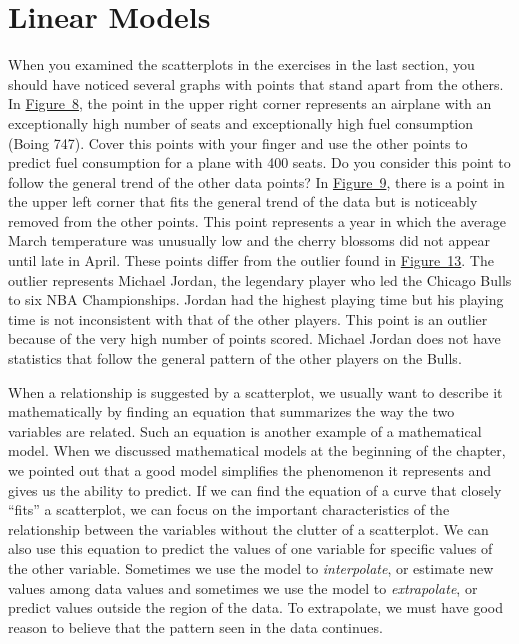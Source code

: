 \documentclass[10pt,]{book}
\theoremstyle{ptxdefinitionnotitle}
\theoremstyle{ptxdefinitiontitle}
\numberwithin{equation}{section}
\begin{document}
\section[{Linear Models}]{Linear Models}\label{chapter01-section05}
\hypertarget{p-92}{}%
When you examined the scatterplots in the exercises in the last section, you should have noticed several graphs with points that stand apart from the others. In \hyperref[exercises-scatterplot-1]{Figure~8}, the point in the upper right corner represents an airplane with an exceptionally high number of seats and exceptionally high fuel consumption (Boing 747). Cover this points with your finger and use the other points to predict fuel consumption for a plane with 400 seats. Do you consider this point to follow the general trend of the other data points? In \hyperref[exercises-scatterplot-2]{Figure~9}, there is a point in the upper left corner that fits the general trend of the data but is noticeably removed from the other points. This point represents a year in which the average March temperature was unusually low and the cherry blossoms did not appear until late in April. These points differ from the outlier found in \hyperref[exercises-scatterplot-6]{Figure~13}. The outlier represents Michael Jordan, the legendary player who led the Chicago Bulls to six NBA Championships. Jordan had the highest playing time but his playing time is not inconsistent with that of the other players. This point is an outlier because of the very high number of points scored. Michael Jordan does not have statistics that follow the general pattern of the other players on the Bulls.%
\par
\hypertarget{p-93}{}%
When a relationship is suggested by a scatterplot, we usually want to describe it mathematically by finding an equation that summarizes the way the two variables are related. Such an equation is another example of a mathematical model. When we discussed mathematical models at the beginning of the chapter, we pointed out that a good model simplifies the phenomenon it represents and gives us the ability to predict. If we can find the equation of a curve that closely “fits” a scatterplot, we can focus on the important characteristics of the relationship between the variables without the clutter of a scatterplot. We can also use this equation to predict the values of one variable for specific values of the other variable. Sometimes we use the model to \emph{interpolate}, or estimate new values among data values and sometimes we use the model to \emph{extrapolate}, or predict values outside the region of the data. To extrapolate, we must have good reason to believe that the pattern seen in the data continues.%
\end{document}
